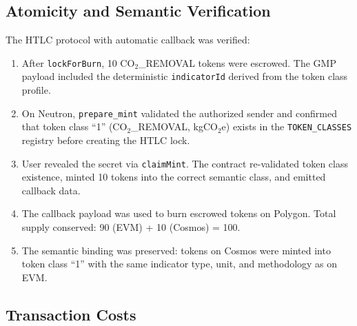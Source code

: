 \documentclass[conference,10pt]{IEEEtran}
\begin{document}
\subsection{Atomicity and Semantic Verification}

The HTLC protocol with automatic callback was verified:

\begin{enumerate}
    \item After \texttt{lockForBurn}, 10 CO$_2$\_REMOVAL tokens were escrowed. The GMP payload included the deterministic \texttt{indicatorId} derived from the token class profile.
    
    \item On Neutron, \texttt{prepare\_mint} validated the authorized sender and confirmed that token class ``1'' (CO$_2$\_REMOVAL, kgCO$_2$e) exists in the \texttt{TOKEN\_CLASSES} registry before creating the HTLC lock.
    
    \item User revealed the secret via \texttt{claimMint}. The contract re-validated token class existence, minted 10 tokens into the correct semantic class, and emitted callback data.
    
    \item The callback payload was used to burn escrowed tokens on Polygon. Total supply conserved: 90 (EVM) + 10 (Cosmos) = 100.
    
    \item The semantic binding was preserved: tokens on Cosmos were minted into token class ``1'' with the same indicator type, unit, and methodology as on EVM.
\end{enumerate}

\subsection{Transaction Costs}
\end{document}
